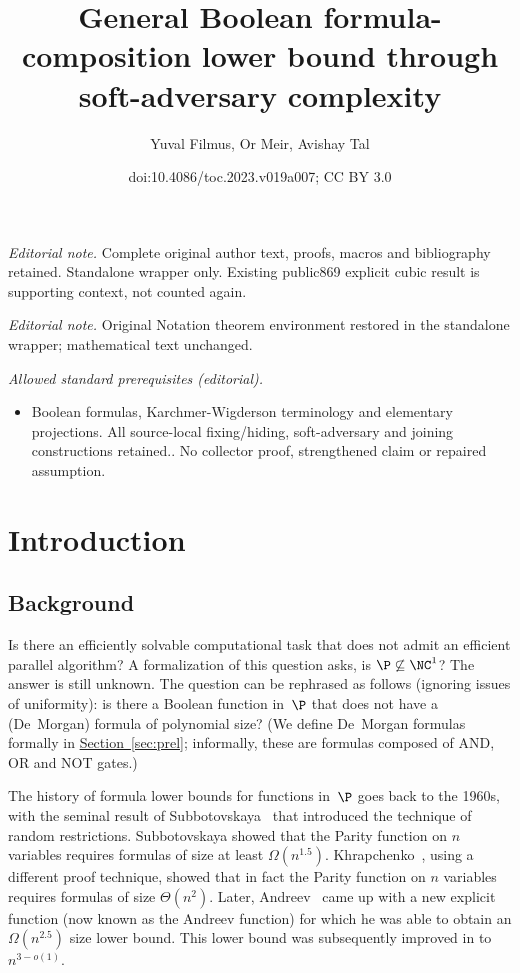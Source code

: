 \documentclass[11pt]{article}
\title{General Boolean formula-composition lower bound through soft-adversary complexity}
\author{Yuval Filmus, Or Meir, Avishay Tal}
\date{doi:10.4086/toc.2023.v019a007; CC BY 3.0}
\numberwithin{equation}{section}
\theoremstyle{definition}
\theoremstyle{plain}
\newcommand{\expref}[2]{\hyperref[#2]{#1~\ref{#2}}}
\theoremstyle{definition}\newtheorem{notation}[theorem]{Notation}\theoremstyle{plain}
\begin{document}
\maketitle
\noindent\textit{Editorial note.} Complete original author text, proofs, macros and bibliography retained. Standalone wrapper only. Existing public869 explicit cubic result is supporting context, not counted again.\par\medskip
\noindent\textit{Editorial note.} Original Notation theorem environment restored in the standalone wrapper; mathematical text unchanged.\par\medskip
\noindent\textit{Allowed standard prerequisites (editorial).}\begin{itemize}
\item Boolean formulas, Karchmer-Wigderson terminology and elementary projections. All source-local fixing/hiding, soft-adversary and joining constructions retained.. No collector proof, strengthened claim or repaired assumption.
\end{itemize}\medskip
\section{Introduction}

\subsection{Background}

%
%
%
%
%
Is there an efficiently solvable computational task
that does not admit an efficient parallel algorithm?  %
%
%
A formalization of this question asks,  %
is $\P\not\subseteq\NC^{1}$? The answer
%
is still unknown. The question can be rephrased as follows (ignoring issues of uniformity): 
is there a
Boolean  %
function in~$\P$ that does not have a (De~Morgan) formula of
polynomial size?   %
%
%
%
(We define De~Morgan formulas formally in \expref{Section}{sec:prel}; informally, these are formulas composed of AND, OR and NOT gates.)

The history of formula lower bounds for functions in~$\P$ goes back
to the 1960s, with the seminal result of Subbotovskaya~\cite{S61}
that introduced the technique of random restrictions. Subbotovskaya
showed that the Parity function on $n$ variables requires formulas
of size at least $\Omega(n^{1.5})$. Khrapchenko~\cite{K72}, using
a different proof technique, showed that in fact the Parity function
on $n$ variables requires formulas of size $\Theta(n^{2})$. Later,
Andreev~\cite{A87} came up with a new explicit function (now known
as the Andreev function) for which he was able to obtain an $\Omega(n^{2.5})$
size lower bound. This lower bound was subsequently improved
%
%
in  %
\cite{IN93,PZ93,H98,T14}
to $n^{3-o(1)}$.
\end{document}
